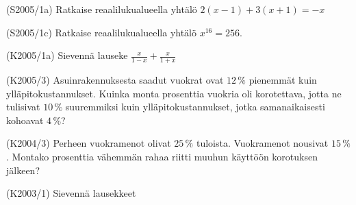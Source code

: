 \begin{tehtava}(S2005/1a) Ratkaise reaalilukualueella yhtälö 
                       $ 2(x - 1) + 3(x + 1 ) = -x $
\end{tehtava}

\begin{tehtava}(S2005/1c) Ratkaise reaalilukualueella yhtälö $ x^{16} = 256 $.
\end{tehtava}

\begin{tehtava}(K2005/1a) Sievennä lauseke
                        $ \frac{x}{1 - x} + \frac{x}{1 + x} $
\end{tehtava}


\begin{tehtava}(K2005/3) Asuinrakennuksesta saadut vuokrat ovat $12\,\%$ pienemmät kuin ylläpitokustannukset. Kuinka monta prosenttia vuokria oli korotettava, jotta ne tulisivat $10\,\%$ suuremmiksi kuin ylläpitokustannukset, jotka samanaikaisesti kohoavat $4\,\%$?
\end{tehtava}

\begin{tehtava}(K2004/3) Perheen vuokramenot olivat $25\,\%$ tuloista. Vuokramenot nousivat $15\,\%$. Montako prosenttia vähemmän rahaa riitti muuhun käyttöön korotuksen jälkeen?
\end{tehtava}


\begin{tehtava}(K2003/1) Sievennä lausekkeet
\end{tehtava}

